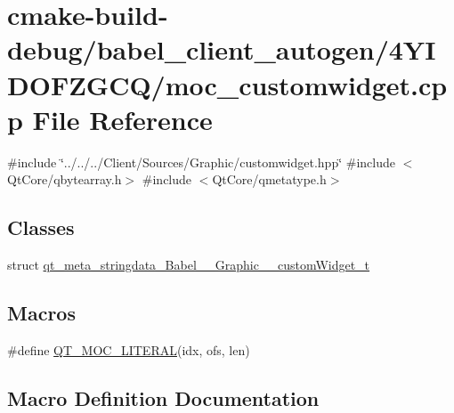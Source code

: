 \hypertarget{cmake-build-debug_2babel__client__autogen_24YIDOFZGCQ_2moc__customwidget_8cpp}{}\section{cmake-\/build-\/debug/babel\+\_\+client\+\_\+autogen/4\+Y\+I\+D\+O\+F\+Z\+G\+C\+Q/moc\+\_\+customwidget.cpp File Reference}
\label{cmake-build-debug_2babel__client__autogen_24YIDOFZGCQ_2moc__customwidget_8cpp}
{\ttfamily \#include \char`\"{}../../../\+Client/\+Sources/\+Graphic/customwidget.\+hpp\char`\"{}}\newline
{\ttfamily \#include $<$Qt\+Core/qbytearray.\+h$>$}\newline
{\ttfamily \#include $<$Qt\+Core/qmetatype.\+h$>$}\newline
\subsection*{Classes}
\begin{DoxyCompactItemize}
\item 
struct \hyperlink{structqt__meta__stringdata__Babel____Graphic____customWidget__t}{qt\+\_\+meta\+\_\+stringdata\+\_\+\+Babel\+\_\+\+\_\+\+Graphic\+\_\+\+\_\+custom\+Widget\+\_\+t}
\end{DoxyCompactItemize}
\subsection*{Macros}
\begin{DoxyCompactItemize}
\item 
\#define \hyperlink{cmake-build-debug_2babel__client__autogen_24YIDOFZGCQ_2moc__customwidget_8cpp_a75bb9482d242cde0a06c9dbdc6b83abe}{Q\+T\+\_\+\+M\+O\+C\+\_\+\+L\+I\+T\+E\+R\+AL}(idx,  ofs,  len)
\end{DoxyCompactItemize}


\subsection{Macro Definition Documentation}
\mbox{\label{cmake-build-debug_2babel__client__autogen_24YIDOFZGCQ_2moc__customwidget_8cpp_a75bb9482d242cde0a06c9dbdc6b83abe}} 
